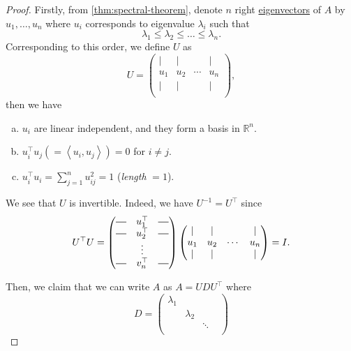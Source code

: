 \begin{proof}
	Firstly, from \autoref{thm:spectral-theorem}, denote \(n\) right \hyperref[def:eigenvector]{eigenvectors} of \(A\) by \(u_1, \ldots , u_n\) where \(u_{i} \) corresponds to eigenvalue \(\lambda _i\) such that
	\[
		\lambda _1 \leq \lambda _2 \leq \ldots  \leq \lambda _n.
	\]
	Corresponding to this order, we define \(U\) as
	\[
		U = \begin{pmatrix}
			\mid & \mid &        & \mid \\
			u_1  & u_2  & \cdots & u_n  \\
			\mid & \mid &        & \mid \\
		\end{pmatrix},
	\]
	then we have
	\begin{enumerate}[(a)]
		\item \(u_i\) are linear independent, and they form a basis in \(\mathbb{R} ^n\).
		\item \(u_{i} ^{\top} u_{j} ( = \left< u_{i} , u_{j}  \right> ) = 0\) for \(i\neq j\).
		\item \(u_{i} ^{\top} u_{i} = \sum_{j=1}^{n} u_{ij}^{2} = 1 \) (\emph{length} \(= 1\)).
	\end{enumerate}
	\begin{remark}[\(U\) is invertible]
		We see that \(U\) is invertible. Indeed, we have \(U^{-1} = U^{\top} \) since
		\[
			U^{\top}U = \begin{pmatrix}
				\horzbar & u^{\top}_1 & \horzbar \\
				\horzbar & u^{\top}_2 & \horzbar \\
				         & \vdots     &          \\
				\horzbar & v^{\top}_n & \horzbar \\
			\end{pmatrix}\begin{pmatrix}
				\mid & \mid &        & \mid \\
				u_1  & u_2  & \cdots & u_n  \\
				\mid & \mid &        & \mid \\
			\end{pmatrix} = I.
		\]
	\end{remark}
	Then, we claim that we can write \(A\) as \(A = U D U^{\top}\) where \[
		D  = \begin{pmatrix}
			\lambda_1 &           &        &           \\
			          & \lambda_2 &        &           \\
			          &           & \ddots &           \\

\end{pmatrix}\]
\end{proof}
